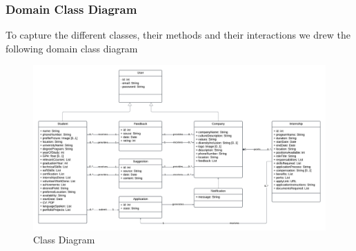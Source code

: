     \subsubsection{Domain Class Diagram}
    To capture the different classes, their methods and their interactions we drew the following domain class diagram
        \begin{figure}[h!]
            \centering
            \includegraphics[width=1\textwidth]{RASD/Images/ClassDiagram.png}
            \caption{Class Diagram}
            \label{fig:example}
        \end{figure}
    
    
    
